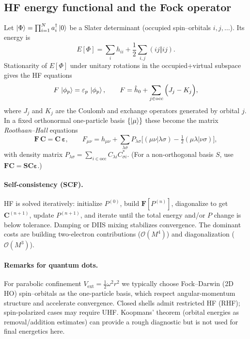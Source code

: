 \subsection{HF energy functional and the Fock operator}
Let $\ket{\Phi}=\prod_{i=1}^N a_i^\dagger\ket{0}$ be a Slater determinant (occupied
spin–orbitals $i,j,\dots$). Its energy is
\[
E[\Phi]= \sum_{i} h_{ii} + \frac{1}{2}\sum_{i,j} (ij\Vert ij).
\]
Stationarity of $E[\Phi]$ under unitary rotations in the occupied+virtual subspace gives the
HF equations
\[
F\,\ket{\phi_p}=\varepsilon_p\,\ket{\phi_p},
\qquad
F=\hat h_0 + \sum_{j\in\mathrm{occ}}
\Big( J_j - K_j \Big),
\]
where $J_j$ and $K_j$ are the Coulomb and exchange operators generated by orbital $j$.
In a fixed orthonormal one-particle basis $\{\ket{\mu}\}$ these become the matrix
\emph{Roothaan--Hall} equations
\[
\mathbf F\,\mathbf C = \mathbf C\,\boldsymbol\varepsilon,\qquad
F_{\mu\nu}=h_{\mu\nu}+\sum_{\lambda\sigma} P_{\lambda\sigma}
\Big[(\mu\nu|\lambda\sigma)-\tfrac12(\mu\lambda|\nu\sigma)\Big],
\]
with density matrix $P_{\lambda\sigma}=\sum_{i\in\mathrm{occ}} C_{\lambda i} C_{\sigma i}^*$.
(For a non-orthogonal basis $S$, use $\mathbf F\mathbf C=\mathbf S\mathbf C\boldsymbol\varepsilon$.)

\paragraph{Self-consistency (SCF).}
HF is solved iteratively:
initialize $P^{(0)}$, build $\mathbf F[P^{(n)}]$, diagonalize to get $\mathbf C^{(n+1)}$,
update $P^{(n+1)}$, and iterate until the total energy and/or $P$ change is below tolerance.
Damping or DIIS mixing stabilizes convergence. The dominant costs are building two-electron
contributions ($\mathcal O(M^4)$) and diagonalization ($\mathcal O(M^3)$).

\paragraph{Remarks for quantum dots.}
For parabolic confinement $V_\mathrm{ext}=\tfrac12\omega^2 r^2$ we typically choose
Fock--Darwin (2D HO) spin–orbitals as the one-particle basis, which respect angular-momentum
structure and accelerate convergence. Closed shells admit restricted HF (RHF); spin-polarized
cases may require UHF. Koopmans’ theorem (orbital energies as removal/addition estimates)
can provide a rough diagnostic but is not used for final energetics here.

\medskip

